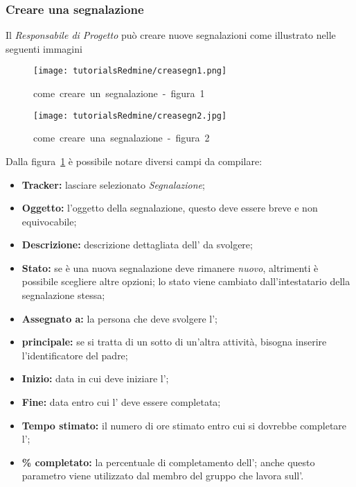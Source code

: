 \documentclass{scalatekids-article}
\begin{document}
\subsubsection{Creare una segnalazione}

Il \textit{Responsabile di Progetto} può creare nuove segnalazioni come illustrato nelle seguenti immagini
\begin{figure}[H]
    \centering
    \texttt{[image: tutorialsRedmine/creasegn1.png]}
    \caption{come\ creare\ un\ segnalazione\ -\ figura\ 1}
\end{figure}
\begin{figure}[H]
    \centering
    \texttt{[image: tutorialsRedmine/creasegn2.jpg]}
    \caption{come\ creare\ una\ segnalazione\ -\ figura\ 2\label{fig:crea-segnalazione-2}}
\end{figure}
Dalla figura~\ref{fig:crea-segnalazione-2} è possibile notare diversi campi da compilare:
\begin{itemize}
    \item \textbf{Tracker:} lasciare selezionato \textit{Segnalazione};
    \item \textbf{Oggetto:} l'oggetto della segnalazione, questo deve essere breve e non equivocabile;
    \item \textbf{Descrizione:} descrizione dettagliata dell' da svolgere;
    \item \textbf{Stato:} se è una nuova segnalazione deve rimanere \textit{nuovo}, altrimenti è possibile scegliere altre opzioni; lo stato viene cambiato dall'intestatario della segnalazione stessa;
    \item \textbf{Assegnato a:} la persona che deve svolgere l';
    \item \textbf{ principale:} se si tratta di un sotto  di un'altra attività, bisogna inserire l'identificatore del  padre;
    \item \textbf{Inizio:} data in cui deve iniziare l';
    \item \textbf{Fine:} data entro cui l' deve essere completata;
    \item \textbf{Tempo stimato:} il numero di ore stimato entro cui si dovrebbe completare l';
    \item \textbf{\% completato:} la percentuale di completamento dell'; anche questo parametro viene utilizzato dal membro del gruppo che lavora sull'.
    \end{itemize}
\end{document}
